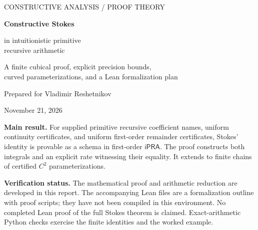 \documentclass[11pt,letterpaper]{article}
\theoremstyle{definition}
\theoremstyle{remark}
\newcommand{\ipra}{\mathsf{iPRA}}
\begin{document}
\begin{titlepage}
\vspace*{0.8in}
{\large\color{teal}\sffamily CONSTRUCTIVE ANALYSIS / PROOF THEORY\par}
\vspace{0.45in}
{\Huge\bfseries\color{ink}Constructive Stokes\par}
\vspace{0.15in}
{\LARGE\color{ink}in intuitionistic primitive\\recursive arithmetic\par}
\vspace{0.4in}
{\large A finite cubical proof, explicit precision bounds,\\
curved parameterizations, and a Lean formalization plan\par}
\vspace{0.55in}
{\large Prepared for Vladimir Reshetnikov\par}
{\large November 21, 2026\par}
\vfill
\noindent\colorbox{pale}{\parbox{\dimexpr\textwidth-2\fboxsep\relax}{
\textbf{Main result.} For supplied primitive recursive coefficient names,
uniform continuity certificates, and uniform first-order remainder certificates,
Stokes' identity is provable as a schema in first-order $\ipra$.
The proof constructs both integrals and an explicit rate witnessing their equality.
It extends to finite chains of certified $C^2$ parameterizations.
}}
\vspace{0.3in}
\noindent\textbf{Verification status.}
The mathematical proof and arithmetic reduction are developed in this report.
The accompanying Lean files are a formalization outline with proof scripts;
they have not been compiled in this environment. No completed Lean proof of
the full Stokes theorem is claimed. Exact-arithmetic Python checks exercise
the finite identities and the worked example.
\end{titlepage}
\end{document}
